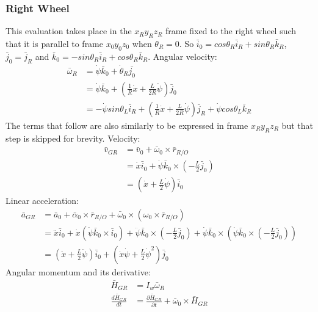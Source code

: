\documentclass[a4paper,10pt]{article}
\begin{document}
\subsubsection{Right Wheel}
This evaluation takes place in the $x_Ry_Rz_R$ frame fixed to the right wheel such that it is parallel to 
frame $x_0y_0z_0$ when $\theta_R = 0$. So $\bar{i}_0 = cos\theta_R\bar{i}_R+sin\theta_R\bar{k}_R$, 
$\bar{j}_0 = \bar{j}_R$ and $\bar{k}_0 = -sin\theta_R\bar{i}_R+cos\theta_R\bar{k}_R$.
Angular velocity:
\begin{align}
 \bar{\omega}_R &= \dot\psi\bar{k}_0 + \dot\theta_R\bar{j_0} \nonumber \\
 &= \dot\psi\bar{k}_0 + \left(\frac{1}{R}\dot{x}+\frac{L}{2R}\dot\psi\right)\bar{j}_0 \nonumber \\
 &= -\dot\psi sin\theta_L\bar{i}_R + \left(\frac{1}{R}\dot{x}+\frac{L}{2R}\dot\psi\right)\bar{j}_R + \dot\psi cos\theta_L\bar{k}_R 
\end{align}
The terms that follow are also similarly to be expressed in frame $x_Ry_Rz_R$ but that step is skipped for brevity.
Velocity:
\begin{align}
  \bar{v}_{GR} &= \bar{v}_0 + \bar{\omega}_0 \times \bar{r}_{R/O} \nonumber \\
 &= \dot{x}\bar{i}_0 + \dot\psi\bar{k}_0 \times \left(-\frac{L}{2}\bar{j}_0\right) \nonumber \\
 &= \left(\dot{x}+\frac{L}{2}\dot\psi\right)\bar{i}_0  
\end{align}
Linear acceleration:
\begin{align}
 \bar{a}_{GR} &= \bar{a}_0 + \bar\alpha_0 \times \bar{r}_{R/O} + \bar\omega_0 \times \left( \omega_0 \times \bar{r}_{R/O}\right) \nonumber \\
 &= \ddot{x}\bar{i}_0 + \dot{x}\left(\dot\psi\bar{k}_0 \times \bar{i}_0\right)+ \ddot\psi\bar{k}_0 \times \left(-\frac{L}{2}\bar{j}_0\right) + \dot\psi\bar{k}_0 \times \left( \dot\psi\bar{k}_0 \times \left(-\frac{L}{2}\bar{j}_0\right)\right) \nonumber \\
 &= \left(\ddot{x}+\frac{L}{2}\ddot\psi\right)\bar{i}_0 + \left(\dot{x}\dot\psi + \frac{L}{2}\dot\psi^2\right)\bar{j}_0  
\end{align}
Angular momentum and its derivative:
\begin{align}
 \bar{H}_{GR} &= I_w\bar{\omega}_R \nonumber \\
 \frac{d\bar{H}_{GR}}{dt} &= \frac{\partial \bar{H}_{GR}}{\partial t} + \bar\omega_0 \times \bar{H}_{GR} \nonumber \\
\end{align}
\end{document}
